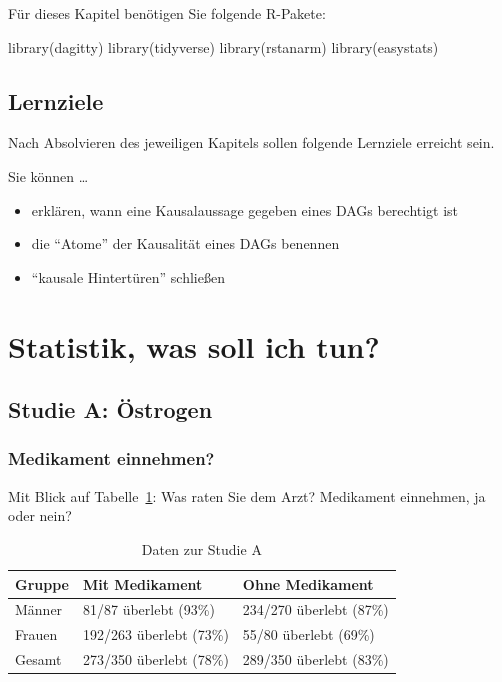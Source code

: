 \documentclass[
  a4paper,
  DIV=11]{scrreprt}
\newenvironment{Shaded}{\begin{snugshade}}{\end{snugshade}}
\newcommand{\FunctionTok}[1]{\textcolor[rgb]{0.28,0.35,0.67}{#1}}
\newcommand{\NormalTok}[1]{\textcolor[rgb]{0.00,0.23,0.31}{#1}}
\providecommand{\tightlist}{%
  \setlength{\itemsep}{0pt}\setlength{\parskip}{0pt}}\usepackage{longtable,booktabs,array}
\theoremstyle{definition}
\theoremstyle{remark}
\begin{document}
Für dieses Kapitel benötigen Sie folgende R-Pakete:

\begin{Shaded}
\begin{Highlighting}[]
\FunctionTok{library}\NormalTok{(dagitty)}
\FunctionTok{library}\NormalTok{(tidyverse)}
\FunctionTok{library}\NormalTok{(rstanarm)}
\FunctionTok{library}\NormalTok{(easystats)}
\end{Highlighting}
\end{Shaded}

\hypertarget{lernziele-10}{%
\subsection{Lernziele}\label{lernziele-10}}

Nach Absolvieren des jeweiligen Kapitels sollen folgende Lernziele
erreicht sein.

Sie können \ldots{}

\begin{itemize}
\tightlist
\item
  erklären, wann eine Kausalaussage gegeben eines DAGs berechtigt ist
\item
  die ``Atome'' der Kausalität eines DAGs benennen
\item
  ``kausale Hintertüren'' schließen
\end{itemize}

\hypertarget{statistik-was-soll-ich-tun}{%
\section{Statistik, was soll ich
tun?}\label{statistik-was-soll-ich-tun}}

\hypertarget{studie-a-uxf6strogen}{%
\subsection{Studie A: Östrogen}\label{studie-a-uxf6strogen}}

\hypertarget{medikament-einnehmen}{%
\subsubsection{Medikament einnehmen?}\label{medikament-einnehmen}}

Mit Blick auf Tabelle~\ref{tbl-studie-a}: Was raten Sie dem Arzt?
Medikament einnehmen, ja oder nein?

\hypertarget{tbl-studie-a}{}
\begin{longtable}{lll}
\caption{\label{tbl-studie-a}Daten zur Studie A }\tabularnewline

\toprule
Gruppe & Mit Medikament & Ohne Medikament \\ 
\midrule
Männer & 81/87 überlebt (93\%) & 234/270 überlebt (87\%) \\ 
Frauen & 192/263 überlebt (73\%) & 55/80 überlebt (69\%) \\ 
Gesamt & 273/350 überlebt (78\%) & 289/350 überlebt (83\%) \\ 
\bottomrule
\end{longtable}
\end{document}
